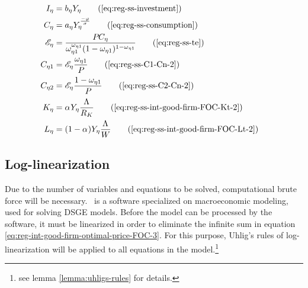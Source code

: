 \documentclass[../thesis.tex]{subfiles}
\begin{document}
\begin{align}
		\\
		I_{\eta} &= b_{\eta} Y_{\eta} \tag{\ref{eq:reg-ss-investment}}
		\\
		C_{\eta} &= a_{\eta} Y_{\eta}^{\frac{-\varphi}{\sigma}} \tag{\ref{eq:reg-ss-consumption}}
		\\
		\te[] &= \frac{P_{} C_{\eta}}{\omega_{\eta 1}^{\omega_{\eta 1}} (1 -\omega_{\eta 1})^{1 -\omega_{\eta 1}}} \tag{\ref{eq:reg-ss-te}}
		\\
		C_{\eta 1} &= \te[] \frac{\omega_{\eta 1}}{P_{}} \tag{\ref{eq:reg-ss-C1-Cn-2}}
		\\
		C_{\eta 2} &= \te[] \frac{1 -\omega_{\eta 1}}{P_{}} \tag{\ref{eq:reg-ss-C2-Cn-2}}
		\\
		K_{\eta} &= {\alpha_{}} Y_{\eta} \frac{\Lambda_{}}{R_K} \tag{\ref{eq:reg-ss-int-good-firm-FOC-Kt-2}}
		\\
		L_{\eta} &= (1-{\alpha_{}}) Y_{\eta} \frac{\Lambda_{}}{W} \tag{\ref{eq:reg-ss-int-good-firm-FOC-Lt-2}}
	\end{align}

		\begin{comment}
			Y_{1} &= \left[ \left( \frac{a_{1}}{1 - b_{1}} \right) \left( \frac{1}{\omega_{11}^{\omega_{11}} (1 - \omega_{11})^{1 - \omega_{11}}} \right) \right]^{\frac{\sigma}{\sigma + \varphi}} \tag{\ref{eq:reg-ss-total-y1}}
			\\
			Y_{2} &= \left[ \left( \frac{a_{2}}{1 - b_{2}} \right) \left( \frac{1}{\omega_{21}^{\omega_{21}} (1 - \omega_{21})^{1 - \omega_{21}}} \right) \right]^{\frac{\sigma}{\sigma + \varphi}} \tag{\ref{eq:reg-ss-total-y2}}
			\\
		\end{comment}

	\newpage
	
	
\subsection{Log-linearization}
	
	Due to the number of variables and equations to be solved, computational brute force will be necessary. \dynare \ is a software specialized on macroeconomic modeling, used for solving DSGE models. Before the model can be processed by the software, it must be linearized in order to eliminate the infinite sum in equation \ref{eq:reg-int-good-firm-optimal-price-FOC-3}. For this purpose, Uhlig's rules of log-linearization \cite{uhlig_toolkit_1999} will be applied to all equations in the model.\footnote{see lemma \ref{lemma:uhligs-rules} for details.}
\end{document}

